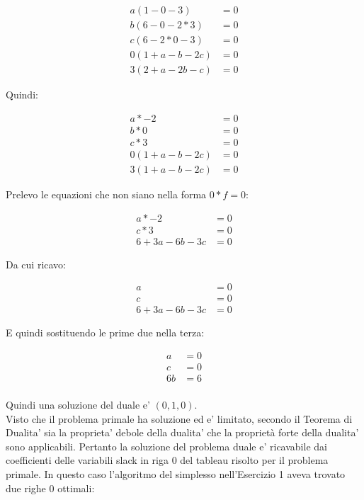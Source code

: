 \documentclass[a4paper,12pt,oneside]{article}
\begin{document}
    \begin{align*}
        a (1 - 0 - 3) & = 0 \\
        b (6 - 0 - 2*3) & = 0 \\
        c (6 - 2*0 - 3) & = 0 \\
        0 (1 + a - b - 2 c) &= 0 \\
        3 (2 + a - 2 b - c) &= 0
    \end{align*}

    Quindi:

    \begin{align*}
        a * -2 & = 0 \\
        b *  0 & = 0 \\
        c *  3 & = 0 \\
        0 (1 + a - b - 2 c) &= 0 \\
        3 (1 + a - b - 2 c) &= 0
    \end{align*}

    Prelevo le equazioni che non siano nella forma $0 * f = 0$:

    \begin{align*}
        a * -2 & = 0 \\
        c *  3 & = 0 \\
        6 + 3a - 6 b - 3 c &= 0
    \end{align*}

    Da cui ricavo:

    \begin{align*}
        a & = 0 \\
        c & = 0 \\
        6 + 3a - 6 b - 3 c &= 0
    \end{align*}

    E quindi sostituendo le prime due nella terza:

    \begin{align*}
        a & = 0 \\
        c & = 0 \\
        6 b &= 6  \\
    \end{align*}

    Quindi una soluzione del duale e' $(0,1,0)$. \\ 
    Visto che il problema primale ha soluzione ed e' limitato, secondo il Teorema di Dualita' sia la proprieta' debole della dualita' che la proprietà forte della dualita' sono applicabili.
    Pertanto la soluzione del problema duale e' ricavabile dai coefficienti delle variabili slack in riga 0 del tableau risolto per il problema primale.
    In questo caso l'algoritmo del simplesso nell'Esercizio 1 aveva trovato due righe 0 ottimali:
\end{document}
